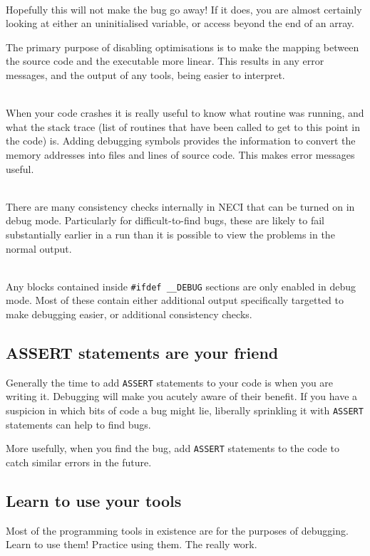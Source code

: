 \documentclass[a4paper,notitlepage,dvipsnames]{scrreprt}
\newcommand\headitem[1]{\needspace{1.5\baselineskip}\item[{\boldmath #1 \nopagebreak}] \hfill \\ \nopagebreak}
\let\code\lstinline
\begin{document}
{{{\begin{description}
	\headitem{Disable optimisations}
		Hopefully this will not make the bug go away! If it does, you are
		almost certainly looking at either an uninitialised variable, or access
		beyond the end of an array.

		The primary purpose of disabling optimisations is to make the mapping
		between the source code and the executable more linear. This results
		in any error messages, and the output of any tools, being easier to
		interpret.

	\headitem{Adds debugging symbols}
		When your code crashes it is really useful to know what routine was
		running, and what the stack trace (list of routines that have been
		called to get to this point in the code) is. Adding debugging symbols
		provides the information to convert the memory addresses into files
		and lines of source code. This makes error messages useful.

	\headitem{Enables the {\ttfamily ASSERT} macro}
		There are many consistency checks internally in NECI that can be turned
		on in debug mode. Particularly for difficult-to-find bugs, these are
		likely to fail substantially earlier in a run than it is possible to
		view the problems in the normal output.

	\headitem{Defines {\ttfamily \_\_DEBUG}}
		Any blocks contained inside \code{#ifdef __DEBUG} sections are
		only enabled in debug mode. Most of these contain either additional
		output specifically targetted to make debugging easier, or additional
		consistency checks.
\end{description}

\subsection{{\ttfamily ASSERT} statements are your friend}
	Generally the time to add \code{ASSERT} statements to your code is
	when you are writing it. Debugging will make you acutely aware of their
	benefit. If you have a suspicion in which bits of code a bug might lie,
	liberally sprinkling it with \code{ASSERT} statements can help to
	find bugs.

	More usefully, when you find the bug, add \code{ASSERT} statements to
	the code to catch similar errors in the future.

\subsection{Learn to use your tools}
	Most of the programming tools in existence are for the purposes of
	debugging. Learn to use them! Practice using them. The really work.

}}}
\end{document}
